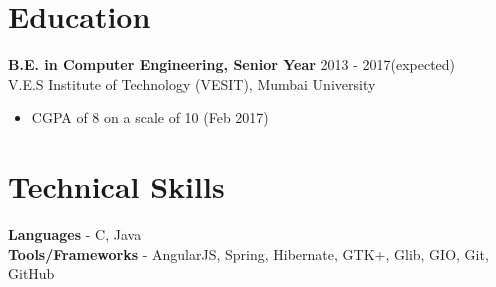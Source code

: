 \documentclass[12pt,margin, centered]{res}
\begin{document}
\begin{resume}
\section{Education}
\vspace{10mm}
\textbf{B.E. in Computer Engineering, Senior Year} \hfill 2013 - 2017(expected) \\
V.E.S Institute of Technology (VESIT), Mumbai University
\begin{itemize}
 \item CGPA of 8 on a scale of 10 (Feb 2017)
\end{itemize}

\section{Technical \hspace{2mm} Skills}
\vspace{10mm}
\textbf{Languages} - C, Java \\
\textbf{Tools/Frameworks} -  AngularJS, Spring, Hibernate, GTK+, Glib, GIO, Git, GitHub




\end{resume}
\end{document}
